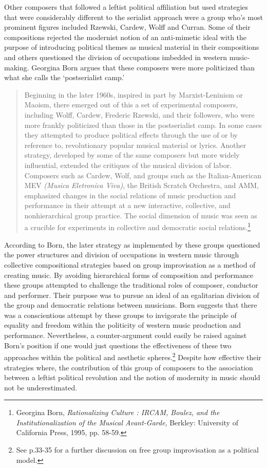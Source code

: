 Other composers that followed a leftist political affiliation but used strategies that were considerably different to the serialist approach were a group who's most prominent figures included Rzewski, Cardew, Wolff and Curran. Some of their compositions rejected the modernist notion of an anti-mimetic ideal with the purpose of introducing political themes as musical material in their compositions and others questioned the division of occupations imbedded in western music-making. Georgina Born argues that these composers were more politicized than what she calls the `postserialist camp.'

\begin{quote}
Beginning in the later 1960s, inspired in part by Marxist-Leninism or Maoism, there emerged out of this a set of experimental composers, including Wolff, Cardew, \mbox{Frederic} Rzewski, and their followers, who were more frankly politicized than those in the \mbox{postserialist} camp. In some cases they attempted to produce political effects through the use of or by reference to, revolutionary popular musical material or lyrics. Another strategy, developed  by some of the same composers but more widely influential, extended the critiques of the musical division of labor. Composers such as Cardew, Wolf, and groups such as the Italian-American MEV \emph{(Musica Eletronica Viva)}, the British Scratch Orchestra, and AMM, emphasized changes in the social relations of music production and performance in their attempt at a new interactive, collective, and nonhierarchical group practice. The social dimension of music was seen as a crucible for experiments in collective and democratic social relations.\footnote{Georgina Born, \emph{Rationalizing Culture : IRCAM, Boulez, and the Institutionalization of the Musical Avant-Garde}, Berkley: University of California Press, 1995, pp. 58-59.}
\end{quote}
According to Born, the later strategy as implemented by these groups questioned the power structures and division of occupations in western music through collective compositional strategies based on group improvisation as a method of creating music. By avoiding hierarchical forms of composition and performance these groups attempted to challenge the traditional roles of composer, conductor and performer. Their purpose was to pursue an ideal of an egalitarian division of the group and democratic relations between musicians. Born suggests that there was a conscientious attempt by these groups to invigorate the principle of equality and freedom within the politicity of western music production and performance. Nevertheless, a counter-argument could easily be raised against Born's position if one would just questions the effectiveness of these two approaches within the political and aesthetic spheres.\footnote{See p.33-35 for a further discussion on free group improvisation as a political model.} Despite how effective their strategies where, the contribution of this group of composers to the association between a leftist political revolution and the notion of modernity in music should not be underestimated.

